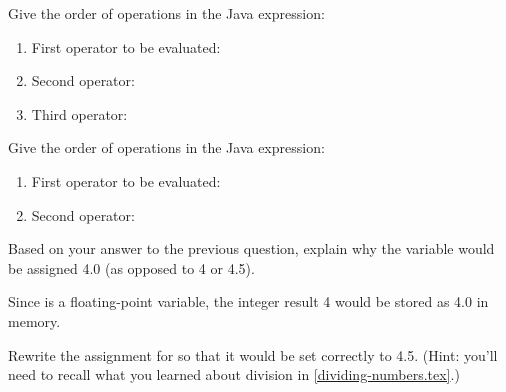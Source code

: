 \Q Give the order of operations in the Java expression: ~ 

\begin{enumerate}[itemsep=2pt]
\item First operator to be evaluated: \ans{\java{-}}
\item Second operator: \ans{\java{*}}
\item Third operator: \ans{\java{=}}
\end{enumerate}


\Q Give the order of operations in the Java expression: ~ 

\begin{enumerate}[itemsep=2pt]
\item First operator to be evaluated: \ans{\java{/}}
\item Second operator: \ans{\java{=}}
\end{enumerate}


\Q Based on your answer to the previous question, explain why the variable  would be assigned 4.0 (as opposed to 4 or 4.5).

\begin{answer}
Since  is a floating-point variable, the integer result 4 would be stored as 4.0 in memory.
\end{answer}


\Q Rewrite the assignment for  so that it would be set correctly to 4.5. (Hint: you'll need to recall what you learned about division in \ref{dividing-numbers.tex}.)

\begin{answer}
\end{answer}
